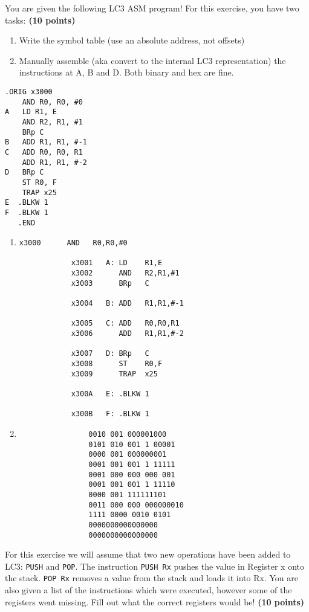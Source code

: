 \documentclass[10pt,answers]{exam}
\newcommand{\qpoints}[1]{\hfill \textbf{(#1 points)}}
\begin{document}
\begin{questions}

\question You are given the following LC3 ASM program! For this exercise, you have two tasks:  \qpoints{10}
\begin{enumerate}
    \item Write the symbol table (use an absolute address, not offsets)
    \item Manually assemble (aka convert to the internal LC3 representation) the instructions at A, B and D. Both binary and hex are fine.
\end{enumerate}

\begin{lstlisting}
.ORIG x3000
    AND R0, R0, #0
A   LD R1, E
    AND R2, R1, #1
    BRp C
B   ADD R1, R1, #-1
C   ADD R0, R0, R1
    ADD R1, R1, #-2
D   BRp C
    ST R0, F
    TRAP x25
E  .BLKW 1
F  .BLKW 1
   .END
\end{lstlisting} 


\begin{solution}
    \begin{enumerate}
		\item 
		\begin{lstlisting}[language={}]
			x3000      AND   R0,R0,#0
			
			x3001   A: LD    R1,E
			x3002      AND   R2,R1,#1
			x3003      BRp   C
			
			x3004   B: ADD   R1,R1,#-1
			
			x3005   C: ADD   R0,R0,R1
			x3006      ADD   R1,R1,#-2
			
			x3007   D: BRp   C
			x3008      ST    R0,F
			x3009      TRAP  x25
			
			x300A   E: .BLKW 1
			
			x300B   F: .BLKW 1
			\end{lstlisting}
			\item 
			\begin{verbatim}
				0010 001 000001000
				0101 010 001 1 00001
				0000 001 000000001
				0001 001 001 1 11111
				0001 000 000 000 001
				0001 001 001 1 11110
				0000 001 111111101
				0011 000 000 000000010
				1111 0000 0010 0101
				0000000000000000
				0000000000000000
				\end{verbatim}
		
	\end{enumerate}
\end{solution}


\question For this exercise we will assume that two new operations have been added to LC3: \texttt{PUSH} and \texttt{POP}. The instruction \texttt{PUSH Rx} pushes the value in Register x onto the stack. \texttt{POP Rx} removes a value from the stack and loads it into Rx. You are also given a list of the instructions which were executed, however some of the registers went missing. Fill out what the correct registers would be! \qpoints{10}


\end{questions}
\end{document}

